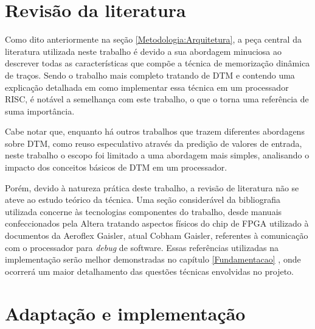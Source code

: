 \section{Revisão da literatura}
\label{Metodologia:Literatura}

Como dito anteriormente na seção \ref{Metodologia:Arquitetura}, a peça central da literatura utilizada neste trabalho é  devido a sua abordagem minuciosa ao descrever todas as características que compõe a técnica de memorização dinâmica de traços. Sendo o trabalho mais completo tratando de DTM e contendo uma explicação detalhada em como implementar essa técnica em um processador RISC, é notável a semelhança com este trabalho, o que o torna uma referência de suma importância.

Cabe notar que, enquanto há outros trabalhos que trazem diferentes abordagens sobre DTM, como reuso especulativo através da predição de valores de entrada, neste trabalho o escopo foi limitado a uma abordagem mais simples, analisando o impacto dos conceitos básicos de DTM em um processador. %



Porém, devido à natureza prática deste trabalho, a revisão de literatura não se ateve ao estudo teórico da técnica. Uma seção considerável da bibliografia utilizada concerne às tecnologias componentes do trabalho, desde manuais confeccionados pela Altera tratando aspectos físicos do chip de FPGA utilizado à documentos da Aeroflex Gaisler, atual Cobham Gaisler, referentes à comunicação com o processador para \textit{debug} de software. Essas referências utilizadas na implementação serão melhor demonstradas 
no capítulo \ref{Fundamentacao}
, onde ocorrerá um maior detalhamento das questões técnicas envolvidas no projeto.


\section{Adaptação e implementação}
\label{Metodologia:Implementacao}

